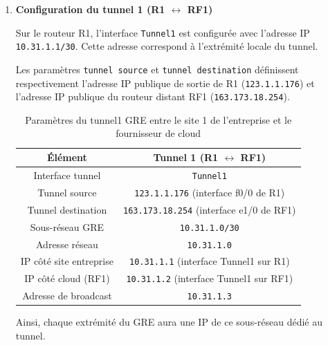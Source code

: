 \documentclass[12pt,a4paper, oneside]{memoir}
\begin{document}
\begin{enumerate}
	\item {\textbf{Configuration du tunnel 1 (R1 $\leftrightarrow$ RF1)}}

Sur le routeur R1, l’interface \texttt{Tunnel1} est configurée avec l’adresse IP \texttt{10.31.1.1/30}. Cette adresse correspond à l’extrémité locale du tunnel.  

Les paramètres \texttt{tunnel source} et \texttt{tunnel destination} définissent respectivement l’adresse IP publique de sortie de R1 (\texttt{123.1.1.176}) et l’adresse IP publique du routeur distant RF1 (\texttt{163.173.18.254}).  

\begin{table}[H]
	\centering
	\begin{tabular}{|c|c|}
		\hline
		\textbf{Élément} & \textbf{Tunnel 1 (R1 $\leftrightarrow$ RF1)} \\
		\hline
		
		Interface tunnel 
		& \texttt{Tunnel1} \\
		\hline
		
		Tunnel source 
		& \texttt{123.1.1.176} (interface f0/0 de R1) \\
		\hline
		
		Tunnel destination 
		& \texttt{163.173.18.254} (interface e1/0 de RF1) \\
		\hline
		
		Sous-réseau GRE 
		& \texttt{10.31.1.0/30} \\
		\hline
		
		Adresse réseau 
		& \texttt{10.31.1.0} \\
		\hline
		
		IP côté site entreprise 
		& \texttt{10.31.1.1} (interface Tunnel1 sur R1)  \\
		\hline
		
		IP côté cloud (RF1) 
		& \texttt{10.31.1.2} (interface Tunnel1 sur RF1)\\
		\hline
		
		Adresse de broadcast 
		& \texttt{10.31.1.3} \\
		\hline
		
	\end{tabular}
	\caption{Paramètres du tunnel1 GRE entre le site 1 de l’entreprise et le fournisseur de cloud}
	\label{tab:gre_tunnel1}
\end{table}

Ainsi, chaque extrémité du GRE aura une IP de ce sous-réseau dédié au tunnel. 



\end{enumerate}
\end{document}
